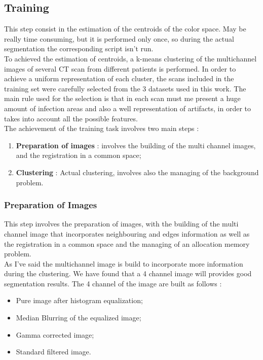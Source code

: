 
	
	\subsection{Training}
	
	This step consist in the estimation of the centroids of the color space. May be  really time consuming, but it is performed only once, so during the actual segmentation the corresponding script isn't run.\\
	To achieved the estimation of centroids, a k-means clustering of the multichannel images of several CT scan from different patients is performed. 
	In order to achieve a uniform representation of each cluster, the scans included in the training set were carefully selected from the $3$ datasets used in this work. The main rule used for the selection is that in each scan must me present a huge amount of infection areas and also a well representation of artifacts, in order to takes into account all the possible features.\\
	The achievement of the training task involves two main steps : 
	\begin{enumerate}
		\item \textbf{Preparation of images} : involves the building of the multi channel images, and the registration in a common space; 
		
		\item \textbf{Clustering} : Actual clustering, involves also the managing of the background problem.
	\end{enumerate}

		\subsubsection*{Preparation of Images} 
	
		This step involves the preparation of images, with the building of the multi channel image that incorporates neighbouring and edges information as well as the registration in a common space and the managing of an allocation memory problem.\\
			
		As I've said the multichannel image is build to incorporate more information during the clustering. We have found that a 4 channel image will provides good segmentation results. The 4 channel of the image are built as follows  : 
		\begin{itemize}
			\item Pure image after histogram equalization; 
			\item Median Blurring of the equalized image; 
			\item Gamma corrected image;
			\item Standard filtered image.
		\end{itemize}
	
